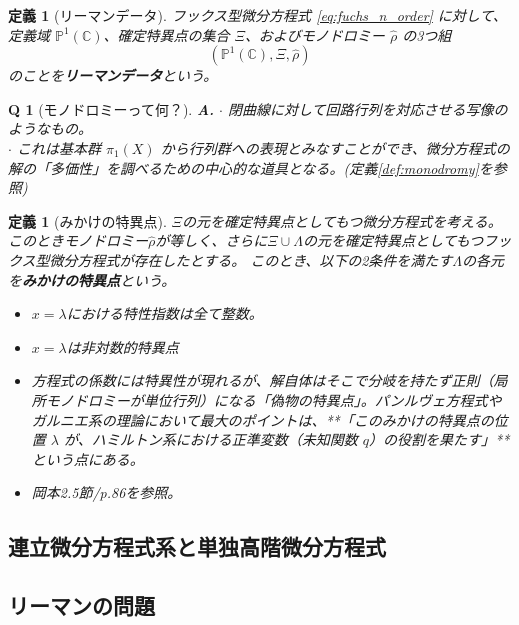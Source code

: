 \documentclass[paper=a4, fontsize=11pt]{jlreq} %
\theoremstyle{break}
\newtheorem{definition}[theorem]{定義}
\theoremstyle{qa}
\newtheorem*{Q}{Q}
\theoremstyle{remark} %
\begin{document}
\begin{definition}[リーマンデータ]\label{def:riemann_data}
    フックス型微分方程式 \eqref{eq:fuchs_n_order} に対して、定義域 $\mathbb{P}^{1}(\mathbb{C})$、確定特異点の集合 $\Xi$、およびモノドロミー $\hat{\rho}$ の3つ組
    \[
    (\mathbb{P}^{1}(\mathbb{C}), \Xi, \hat{\rho})
    \]
    のことを\textbf{リーマンデータ}という。
\end{definition}

\begin{Q}[モノドロミーって何？]
\textbf{A.} $\cdot$ 閉曲線に対して回路行列を対応させる写像のようなもの。\\
 $\cdot$ これは基本群 $\pi_1(X)$ から行列群への表現とみなすことができ、微分方程式の解の「多価性」を調べるための中心的な道具となる。(定義\ref{def:monodromy}を参照)\\
\end{Q}

\begin{definition}[みかけの特異点]%
    $\Xi$の元を確定特異点としてもつ微分方程式を考える。
    このときモノドロミー$\hat{\rho}$が等しく、さらに$\Xi\cup\Lambda$の元を確定特異点としてもつフックス型微分方程式が存在したとする。
    このとき、以下の2条件を満たす$\Lambda$の各元を\textbf{みかけの特異点}という。
    \begin{itemize}
        \item[(1)] $x=\lambda$における特性指数は全て整数。
        \item[(2)] $x=\lambda$は非対数的特異点
    \end{itemize}
    \begin{itemize}
        \item[\textbf{Insight:}] 方程式の係数には特異性が現れるが、解自体はそこで分岐を持たず正則（局所モノドロミーが単位行列）になる「偽物の特異点」。パンルヴェ方程式やガルニエ系の理論において最大のポイントは、**「このみかけの特異点の位置 $\lambda$ が、ハミルトン系における正準変数（未知関数 $q$）の役割を果たす」**という点にある。
        \item[\textbf{Link:}] 岡本2.5節/p.86を参照。
    \end{itemize}
\end{definition}

\subsection{連立微分方程式系と単独高階微分方程式}

\subsection{リーマンの問題}
\end{document}
